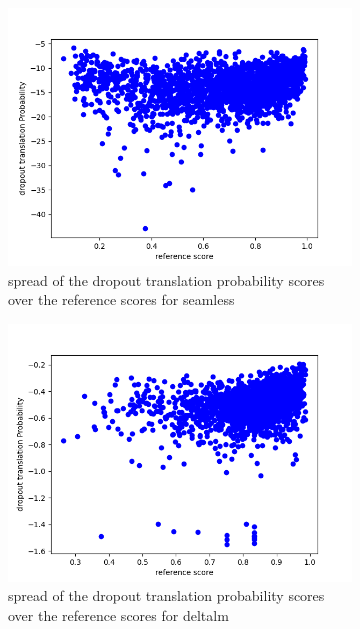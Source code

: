 \begin{figure}[h]
    \centering
    \begin{subfigure}{0.4\linewidth}
        \includegraphics[width=\textwidth]{Latex/sections/images/seamlessdropprob.png}
        \caption{spread of the dropout translation probability scores over the reference scores for seamless}
    \end{subfigure}
    \begin{subfigure}{0.4\linewidth}
        \includegraphics[width=\textwidth]{Latex/sections/images/dlmdropprob.png}
        \caption{spread of the dropout translation probability scores over the reference scores for deltalm}
    \end{subfigure}
    \begin{subfigure}{0.4\linewidth}

\end{subfigure}
\end{figure}
